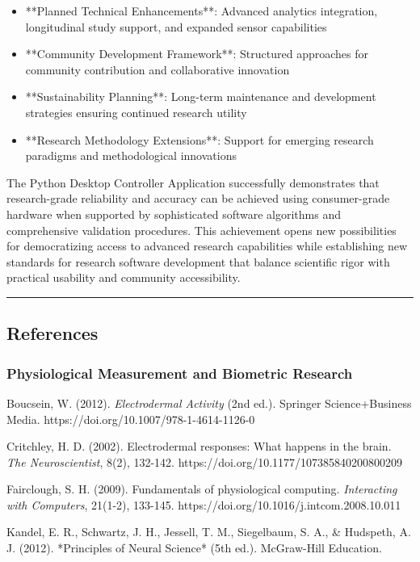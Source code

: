 \documentclass[12pt,a4paper]{article}
\begin{document}
\begin{itemize}
\item **Planned Technical Enhancements**: Advanced analytics integration, longitudinal study support, and expanded sensor
  capabilities
\item **Community Development Framework**: Structured approaches for community contribution and collaborative innovation
\item **Sustainability Planning**: Long-term maintenance and development strategies ensuring continued research utility
\item **Research Methodology Extensions**: Support for emerging research paradigms and methodological innovations

\end{itemize}
The Python Desktop Controller Application successfully demonstrates that research-grade reliability and accuracy can be
achieved using consumer-grade hardware when supported by sophisticated software algorithms and comprehensive validation
procedures. This achievement opens new possibilities for democratizing access to advanced research capabilities while
establishing new standards for research software development that balance scientific rigor with practical usability and
community accessibility.

\hrule

\subsection{References}

\subsubsection{Physiological Measurement and Biometric Research}

Boucsein, W. (2012). \textit{Electrodermal Activity} (2nd ed.). Springer Science+Business
Media. https://doi.org/10.1007/978-1-4614-1126-0

Critchley, H. D. (2002). Electrodermal responses: What happens in the brain. \textit{The Neuroscientist}, 8(2),
132-142. https://doi.org/10.1177/107385840200800209

Fairclough, S. H. (2009). Fundamentals of physiological computing. \textit{Interacting with Computers}, 21(1-2),
133-145. https://doi.org/10.1016/j.intcom.2008.10.011

Kandel, E. R., Schwartz, J. H., Jessell, T. M., Siegelbaum, S. A., \& Hudspeth, A. J. (2012). *Principles of Neural
Science* (5th ed.). McGraw-Hill Education.
\end{document}
